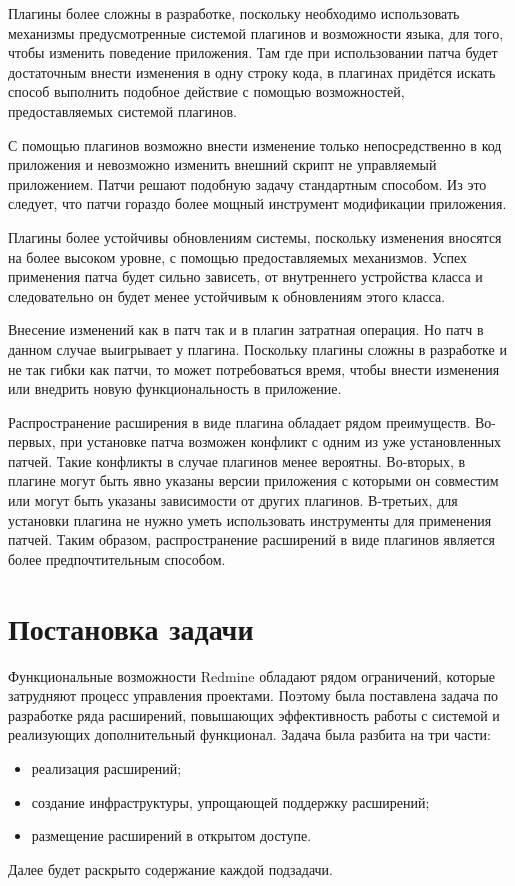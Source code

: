 Плагины более сложны в разработке, поскольку необходимо использовать
механизмы предусмотренные системой плагинов и возможности языка, для того,
чтобы изменить поведение приложения. Там где при использовании патча будет
достаточным внести изменения в одну строку кода, в плагинах придётся искать
способ выполнить подобное действие с помощью возможностей, предоставляемых
системой плагинов.

С помощью плагинов возможно внести изменение только непосредственно в код
приложения и невозможно изменить внешний скрипт не управляемый приложением.
Патчи решают подобную задачу стандартным способом. Из это следует, что патчи
гораздо более мощный инструмент модификации приложения.

Плагины более устойчивы обновлениям системы, поскольку изменения вносятся на
более высоком уровне, с помощью предоставляемых механизмов. Успех применения
патча будет сильно зависеть, от внутреннего устройства класса и следовательно
он будет менее устойчивым к обновлениям этого класса.

Внесение изменений как в патч так и в плагин затратная операция. Но патч в
данном случае выигрывает у плагина. Поскольку плагины сложны в разработке и не
так гибки как патчи, то может потребоваться время, чтобы внести изменения или
внедрить новую функциональность в приложение.

Распространение расширения в виде плагина обладает рядом преимуществ.
Во-первых, при установке патча возможен конфликт с одним из уже установленных
патчей. Такие конфликты в случае плагинов менее вероятны. Во-вторых, в плагине
могут быть явно указаны версии приложения с которыми он совместим или могут
быть указаны зависимости от других плагинов. В-третьих, для установки плагина
не нужно уметь использовать инструменты для применения патчей. Таким образом,
распространение расширений в виде плагинов является более предпочтительным
способом.

\section{Постановка задачи}
Функциональные возможности Redmine обладают рядом ограничений, которые
затрудняют процесс управления проектами. Поэтому была поставлена задача по
разработке ряда расширений, повышающих эффективность работы с системой и
реализующих дополнительный функционал. Задача была разбита на три части:
\begin{itemize}
  \item реализация расширений;
  \item создание инфраструктуры, упрощающей поддержку расширений;
  \item размещение расширений в открытом доступе.
\end{itemize}
Далее будет раскрыто содержание каждой подзадачи.

